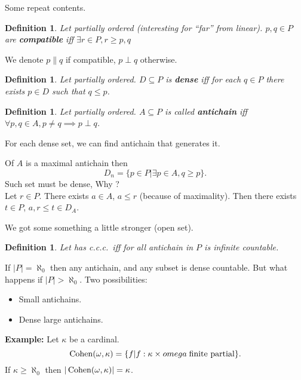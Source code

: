 \documentclass[11pt,pdftex,twoside,a4paper]{article}
\newcommand{\B}[1]{\textbf{#1}}
\newcommand{\Cohen}{\mathop{\rm Cohen}\nolimits}
\newcommand{\ccc}{c.c.c.}
\newtheorem{ldef}[thm]{Definition}
\begin{document}
Some repeat contents.

\begin{ldef}
Let  partially ordered
{\small (interesting for ``far'' from linear)}.
\(p,q\in P\) are \B{compatible}
iff \(\exists r\in P, r\geq p,q\)
\end{ldef}
We denote \(p\| q\) if compatible, \(p\perp q\) otherwise.

\begin{ldef}
Let  partially ordered.
\(D\subseteq P\) is \B{dense} iff for each \(q\in P\) there exists \(p\in D\)
such that \(q\leq p\).
\end{ldef}

\begin{ldef}
Let  partially ordered.
\(A\subseteq P\) is called \B{antichain} iff
\hbox{\(\forall p,q\in A, p\neq q \implies p\perp q\)}.
\end{ldef}

For each dense set, we can find antichain that generates it.

Of $A$ is a maximal antichain then
\begin{equation*}
D_n = \{ p\in P | \exists p \in A, q \geq p\}.
\end{equation*}
Such set must be dense, Why ?\\
Let \(r\in P\). There exists \(a\in A\), \(a \leq r\) (because of maximality).
Then there exists \(t\in P\), \(a,r\leq t \in D_A\).

We got some something a little stronger (open set).

\begin{ldef}
Let  has \ccc\ iff for all antichain in $P$ 
is infinite countable.
\end{ldef}

If \(|P|=\aleph_0\) then any antichain, and any subset is dense countable.
But what happens if \(|P| > \aleph_0\). Two possibilities:
\begin{itemize}
\item Small antichains.
\item Dense large antichains.
\end{itemize}

\B{Example:} Let \(\kappa\) %
be a cardinal.
\begin{equation*}
\Cohen(\omega,\kappa) 
  = \{f | f: \kappa \times omega \; \textnormal{finite partial}\}.
\end{equation*}
If \(\kappa \geq \aleph_0\) then \(|\Cohen(\omega,\kappa)| = \kappa\).
\end{document}
